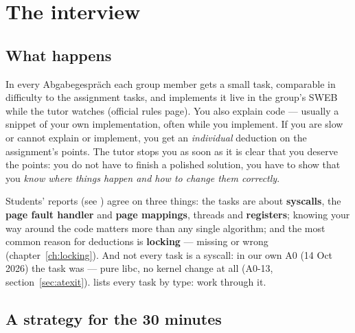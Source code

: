 \chapter{The interview}
\label{ch:interview}

\section{What happens}

In every Abgabegespräch each group member gets a small task, comparable in difficulty to
the assignment tasks, and implements it live in the group's SWEB while the tutor watches
(official rules page). You also explain code --- usually a snippet of your own
implementation, often while you implement. If you are slow or cannot explain or
implement, you get an \emph{individual} deduction on the assignment's points. The tutor
stops you as soon as it is clear that you deserve the points: you do not have to finish a
polished solution, you have to show that you \emph{know where things happen and how to
change them correctly}.

Students' reports (see ) agree on three things: the tasks are about
\textbf{syscalls}, the \textbf{page fault handler} and \textbf{page mappings}, threads and
\textbf{registers}; knowing your way around the code matters more than any single
algorithm; and the most common reason for deductions is \textbf{locking} --- missing or
wrong (chapter~\ref{ch:locking}). And not every task is a syscall: in our own A0 (14 Oct 2026)
the task was  --- pure libc, no kernel change at all (A0-13,
section~\ref{sec:atexit}).  lists every task by type: work through it.

\section{A strategy for the 30 minutes}

